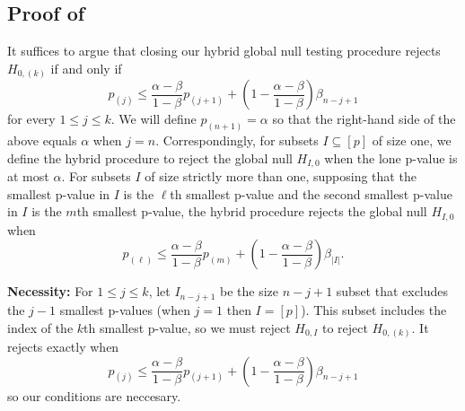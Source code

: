 \documentclass{article}
\begin{document}
\begin{appendix}
\subsection{Proof of }

It suffices to argue that closing our hybrid global null testing procedure rejects $H_{0, (k)}$ if and only if 
\begin{equation*}
p_{(j)} \leq \frac{\alpha - \beta}{1-\beta} p_{(j + 1)} + \left(1 - \frac{\alpha - \beta}{1-\beta} \right)\beta_{n - j + 1} 
\end{equation*}
for every $1 \leq j \leq k$. We will define $p_{(n+1)} = \alpha$ so that the right-hand side of the above equals $\alpha$ when $j = n$. Correspondingly, for subsets $I \subseteq [p]$ of size one, we define the hybrid procedure to reject the global null $H_{I, 0}$ when the lone p-value is at most $\alpha$. For subsets $I$ of size strictly more than one, supposing that the smallest p-value in $I$ is the $\ell$th smallest p-value and the second smallest p-value in $I$ is the $m$th smallest p-value, the hybrid procedure rejects the global null $H_{I, 0}$ when
\begin{equation*}
    p_{(\ell)} \leq \frac{\alpha-\beta}{1-\beta} p_{(m)} + \left(1 - \frac{\alpha - \beta}{1-\beta} \right)\beta_{|I|}.
\end{equation*}

\noindent \textbf{Necessity: } For $1 \leq j \leq k$, let $I_{n-j + 1}$ be the size $n - j + 1$ subset that excludes the $j - 1$ smallest p-values (when $j = 1$ then $I = [p]$). This subset includes the index of the $k$th smallest p-value, so we must reject $H_{0, I}$ to reject $H_{0, (k)}$. It rejects exactly when
\begin{equation*}
    p_{(j)} \leq \frac{\alpha - \beta}{1-\beta} p_{(j + 1)} + \left(1 - \frac{\alpha - \beta}{1-\beta} \right)\beta_{n - j + 1}
\end{equation*}
so our conditions are neccesary. \newline 


\end{appendix}
\end{document}
